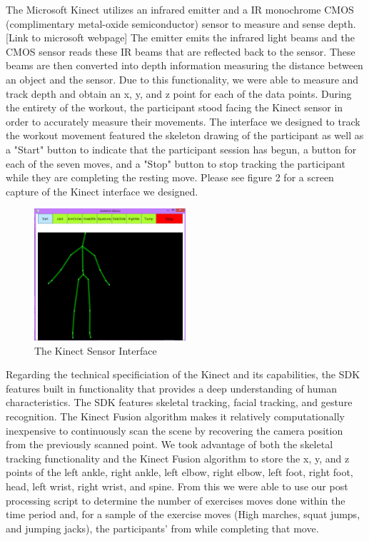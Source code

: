 The Microsoft Kinect utilizes an infrared emitter and a IR monochrome CMOS (complimentary metal-oxide semiconductor) sensor to measure and sense depth. [Link to microsoft webpage]  The emitter emits the infrared light beams and the CMOS sensor reads these IR beams that are reflected back to the sensor.  These beams are then converted into depth information measuring the distance between an object and the sensor.  Due to this functionality, we were able to measure and track depth and obtain an x, y, and z point for each of the data points.   During the entirety of the workout, the participant stood facing the Kinect sensor in order to accurately measure their movements.  The interface we designed to track the workout movement featured the skeleton drawing of the participant as well as a "Start" button to indicate that the participant session has begun, a button for each of the seven moves, and a "Stop" button to stop tracking the participant while they are completing the resting move.  Please see figure 2 for a screen capture of the Kinect interface we designed.  \\
\begin{figure} [h]
	\includegraphics[width=0.5\textwidth]{images/figure2}
\caption{The Kinect Sensor Interface}
\end{figure}


Regarding the technical specificiation of the Kinect and its capabilities, the SDK features built in functionality that provides a deep understanding of human characteristics.  The SDK features skeletal tracking, facial tracking, and gesture recognition.  The Kinect Fusion algorithm makes it relatively computationally inexpensive to continuously scan the scene by recovering the camera position from the previously scanned point.  We took advantage of both the skeletal tracking functionality and the Kinect Fusion algorithm to store the x, y, and z points of the left ankle, right ankle, left elbow, right elbow, left foot, right foot, head, left wrist, right wrist, and spine.  From this we were able to use our post processing script to determine the number of exercises moves done within the time period and, for a sample of the exercise moves (High marches, squat jumps, and jumping jacks), the participants' from while completing that move.